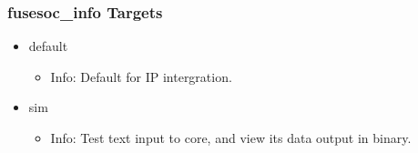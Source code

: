 \subsubsection{fusesoc\_info Targets}
\begin{itemize}
\item default
	\begin{itemize}
	\item[$\space$] Info: Default for IP intergration.
	\end{itemize}
\item sim
	\begin{itemize}
	\item[$\space$] Info: Test text input to core, and view its data output in binary.
	\end{itemize}
\end{itemize}
